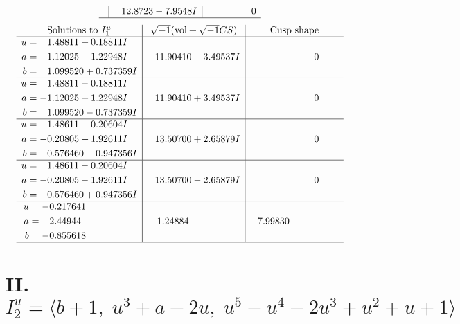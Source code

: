 \documentclass[1p]{elsarticle_modified}
\theoremstyle{definition}
\newcommand{\I}{\sqrt{-1}}
\begin{document}
$$\begin{array}{c|c|c}
 & \phantom{-}12.8723 - 7.9548 I & \phantom{-0.000000 } 0\\
 \hline 
 \end{array}$$\newpage$$\begin{array}{c|c|c}  
\text{Solutions to }I^u_{1}& \I (\text{vol} + \sqrt{-1}CS) & \text{Cusp shape}\\
 \hline 
\begin{aligned}
u &= \phantom{-}1.48811 + 0.18811 I \\
a &= -1.12025 - 1.22948 I \\
b &= \phantom{-}1.099520 + 0.737359 I\end{aligned}
 & \phantom{-}11.90410 - 3.49537 I & \phantom{-0.000000 } 0 \\ \hline\begin{aligned}
u &= \phantom{-}1.48811 - 0.18811 I \\
a &= -1.12025 + 1.22948 I \\
b &= \phantom{-}1.099520 - 0.737359 I\end{aligned}
 & \phantom{-}11.90410 + 3.49537 I & \phantom{-0.000000 } 0 \\ \hline\begin{aligned}
u &= \phantom{-}1.48611 + 0.20604 I \\
a &= -0.20805 + 1.92611 I \\
b &= \phantom{-}0.576460 - 0.947356 I\end{aligned}
 & \phantom{-}13.50700 + 2.65879 I & \phantom{-0.000000 } 0 \\ \hline\begin{aligned}
u &= \phantom{-}1.48611 - 0.20604 I \\
a &= -0.20805 - 1.92611 I \\
b &= \phantom{-}0.576460 + 0.947356 I\end{aligned}
 & \phantom{-}13.50700 - 2.65879 I & \phantom{-0.000000 } 0 \\ \hline\begin{aligned}
u &= -0.217641\phantom{ +0.000000I} \\
a &= \phantom{-}2.44944\phantom{ +0.000000I} \\
b &= -0.855618\phantom{ +0.000000I}\end{aligned}
 & -1.24884\phantom{ +0.000000I} & -7.99830\phantom{ +0.000000I}\\
 \hline 
 \end{array}$$\newpage\newpage\renewcommand{\arraystretch}{1}
\centering \section*{II. $I^u_{2}= \langle b+1,\;u^3+a-2 u,\;u^5- u^4-2 u^3+u^2+u+1 \rangle$}
\end{document}
